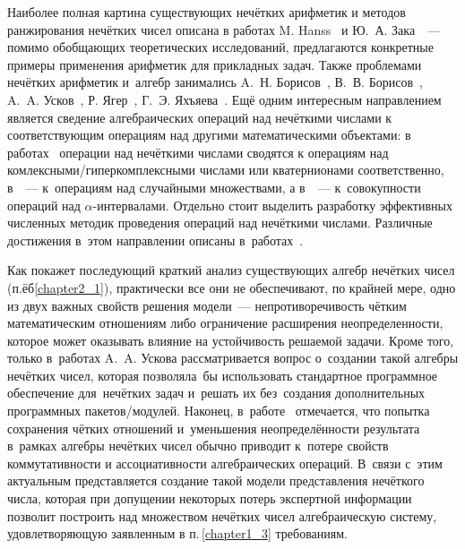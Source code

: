Наиболее полная картина существующих нечётких арифметик и методов ранжирования нечётких чисел описана в работах M. Hanss~\cite{Hanss, Hanss_Engineering, Hanss_Strict_Arithmetic} и Ю.~А. Зака~\cite{Zak}~--- помимо обобщающих теоретических исследований, предлагаются конкретные примеры применения арифметик для прикладных задач. Также проблемами нечётких арифметик и~алгебр занимались A.~Н. Борисов~\cite{Borisov_Alexeev_Msk, Borisov_Krumberg_Riga}, В.~В. Борисов~\cite{Borisov_Fedulov_Arithmetics}, A.~A. Усков~\cite{Uskov_Complex, Uskov_Hypercomplex, Uskov_Quaternion, Uskov_PPS}, Р. Ягер~\cite{Yager_Filev, Yager_Arithmetics}, Г.~Э. Яхъяева~\cite{Yakhyaeva}. Ещё одним интересным направлением является сведение алгебраических операций над нечёткими числами к соответствующим операциям над другими математическими объектами: в работах~\cite{Uskov_Complex, Uskov_Hypercomplex, Uskov_Quaternion} операции над нечёткими числами сводятся к операциям над комлексными/гиперкомплексными числами или кватернионами соответственно, в~\cite{Orlov_Statistics}~--- к~операциям над случайными множествами, а в~\cite{Levin, Altunin_Semukhin}~--- к~совокупности операций над $\alpha$-интервалами. Отдельно стоит выделить разработку эффективных численных методик проведения операций над нечёткими числами. Различные достижения в~этом направлении описаны в~работах~\cite{Kruglov_Balashov, Bocharnkinov_Ukraine, Gallyamov, Bangladesh, Koroteev_Fuzzy_Arithmetics, Borisov_Krumberg_Riga, Borisov_Alexeev_Msk, Evdokimov}.

Как покажет последующий краткий анализ существующих алгебр нечётких чисел (п.ёб\ref{chapter2_1}), практически все они не обеспечивают, по крайней мере, одно из двух важных свойств решения модели~--- непротиворечивость чётким математическим отношениям либо ограничение расширения неопределенности, которое может оказывать влияние на устойчивость решаемой задачи. Кроме того, только в~работах A.~A. Ускова рассматривается вопрос о~создании такой алгебры нечётких чисел, которая позволяла~бы использовать стандартное программное обеспечение для~нечётких задач и~решать их без~создания дополнительных программных пакетов/модулей. Наконец, в~работе~\cite{Kreinovich_100plus1} отмечается, что попытка сохранения чётких отношений и~уменьшения неопределённости результата в~рамках алгебры нечётких чисел обычно приводит к~потере свойств коммутативности и ассоциативности алгебраических операций. В~связи с~этим актуальным представляется создание такой модели представления нечёткого числа, которая при допущении некоторых потерь экспертной информации позволит построить над множеством нечётких чисел алгебраическую систему, удовлетворяющую заявленным в п.\,\ref{chapter1_3} требованиям.

